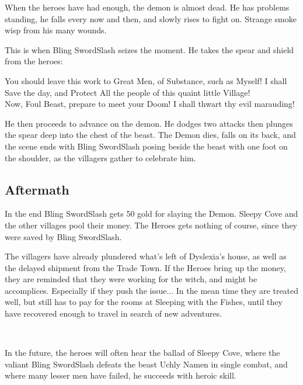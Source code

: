 When the heroes have had enough, the demon is almost dead. He has problems standing, he falls every now and then, and slowly rises to fight on. Strange smoke wisp from his many wounds.

This is when Bling SwordSlash seizes the moment. He takes the spear and shield from the heroes:

\begin{readoutloud}
You should leave this work to Great Men, of Substance, such as Myself! I shall Save the day, and Protect All the people of this quaint little Village! \\
Now, Foul Beast, prepare to meet your Doom! I shall thwart thy evil marauding!
\end{readoutloud}

He then proceeds to advance on the demon. He dodges two attacks then plunges the spear deep into the chest of the beast. The Demon dies, falls on its back, and the scene ends with Bling SwordSlash posing beside the beast with one foot on the shoulder, as the villagers gather to celebrate him.


\subsection*{Aftermath}
In the end Bling SwordSlash gets 50 gold for slaying the Demon. Sleepy Cove and the other villages pool their money. The Heroes gets nothing of course, since they were saved by Bling SwordSlash.

The villagers have already plundered what's left of Dyslexia's house, as well as the delayed shipment from the Trade Town. If the Heroes bring up the money, they are reminded that they were working for the witch, and might be accomplices. Especially if they push the issue... In the mean time they are treated well, but still has to pay for the rooms at Sleeping with the Fishes, until they have recovered enough to travel in search of new adventures.

\

In the future, the heroes will often hear the ballad of Sleepy Cove, where the valiant Bling SwordSlash defeats the beast Uchly Namen in single combat, and where many lesser men have failed, he succeeds with heroic skill.














